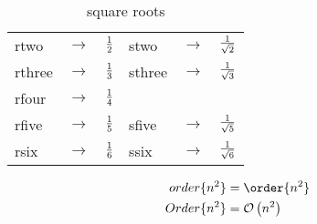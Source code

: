 \begin{table}[htdp]
\begin{center}
\begin{tabular}{lcllcl}
  rtwo & $\to$ & $\frac{1}{2}$ & stwo & $\to$ & $\frac{1}{\sqrt{2}}$\\
  rthree & $\to$ & $\frac{1}{3}$ & sthree & $\to$ & $\frac{1}{\sqrt{3}}$\\
  rfour & $\to$ & $\frac{1}{4}$\\
  rfive & $\to$ & $\frac{1}{5}$ & sfive & $\to$ & $\frac{1}{\sqrt{5}}$\\
  rsix & $\to$ & $\frac{1}{6}$ & ssix & $\to$ & $\frac{1}{\sqrt{6}}$\\
\end{tabular}
\end{center}
\caption{square roots}
\end{table}%

\begin{equation}
\begin{split}
  order \{n^{2}\} & = \order{n^{2}}\\
  Order \{n^{2}\} & = \Order{n^{2}}\\
\end{split}
\end{equation}


